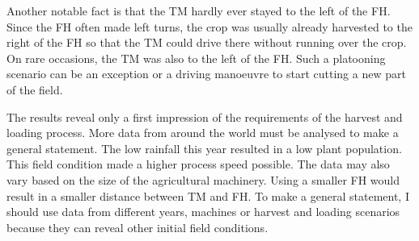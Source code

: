 Another notable fact is that the \ac{TM} hardly ever stayed to the left of the \ac{FH}.
Since the \ac{FH} often made left turns, the crop was usually already harvested to the right of the \ac{FH} so
that the \ac{TM} could drive there without running over the crop.
On rare occasions, the \ac{TM} was also to the left of the \ac{FH}.
Such a platooning scenario can be an exception or a driving manoeuvre to start cutting a new part of the field.

The results reveal only a first impression of the requirements of the harvest and loading process.
More data from around the world must be analysed to make a general statement.
The low rainfall this year resulted in a low plant population.
This field condition made a higher process speed possible.
The data may also vary based on the size of the agricultural machinery.
Using a smaller \ac{FH} would result in a smaller distance between \ac{TM} and \ac{FH}.
To make a general statement, I should use data from different years, machines or harvest and loading scenarios
because they can reveal other initial field conditions.

